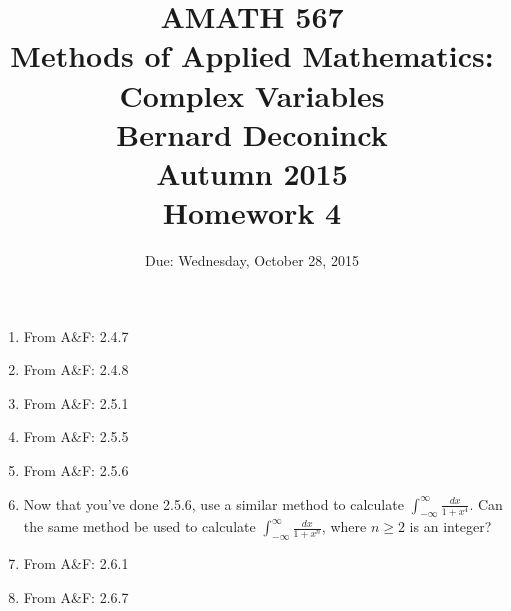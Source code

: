 \documentclass[12pt, a4paper]{article}
\begin{document}
\title{{AMATH 567\\
Methods of Applied Mathematics: Complex Variables}\\
Bernard Deconinck\\
Autumn 2015\\
{\bf \Huge Homework 4}}

\author{Due: Wednesday, October 28, 2015}

\date{}

\maketitle

\begin{enumerate}

\item From A\&F: 2.4.7

\item From A\&F: 2.4.8

\item From A\&F: 2.5.1


\item From A\&F: 2.5.5

\item From A\&F: 2.5.6

\item Now that you've done 2.5.6, use a similar method to calculate
$\int_{-\infty}^\infty\frac{dx}{1+x^4}$. Can the same method be used
to calculate $\int_{-\infty}^\infty\frac{dx}{1+x^n}$, where $n\geq
2$ is an integer?

\item From A\&F: 2.6.1



\item From A\&F: 2.6.7

\end{enumerate}
\end{document}
